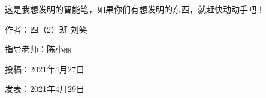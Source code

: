 这是我想发明的智能笔，如果你们有想发明的东西，就赶快动动手吧！





\vspace{10pt}



作者：四（2）班 刘笑



指导老师：陈小丽



投稿：2021年4月27日



发表：2021年4月29日
































                



\vspace{10pt}

\hline



